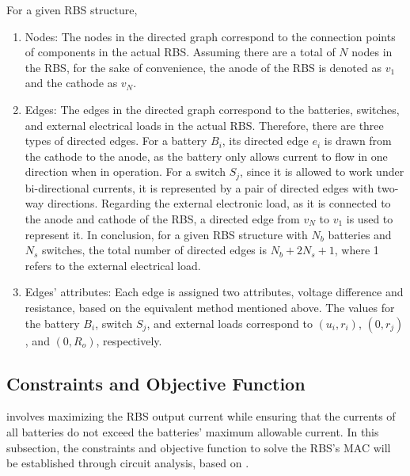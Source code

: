 \documentclass{article}
\begin{document}
For a given RBS structure, 
\begin{enumerate}
    \item Nodes:
        The nodes in the directed graph correspond to the connection points of components in the actual RBS. 
        Assuming there are a total of $N$ nodes in the RBS, for the sake of convenience, the anode of the RBS is denoted as $v_1$ and the cathode as $v_N$.
    \item Edges:
        The edges in the directed graph correspond to the batteries, switches, and external electrical loads in the actual RBS.
        Therefore, there are three types of directed edges. 
        For a battery $B_i$, its directed edge $e_i$ is drawn from the cathode to the anode, as the battery only allows current to flow in one direction when in operation.
        For a switch $S_j$, since it is allowed to work under bi-directional currents, it is represented by a pair of directed edges with two-way directions. 
        Regarding the external electronic load, as it is connected to the anode and cathode of the RBS, a directed edge from $v_N$ to $v_1$ is used to represent it. 
        In conclusion, for a given RBS structure with $N_b$ batteries and $N_s$ switches, the total number of directed edges is $N_b+2N_s+1$, where 1 refers to the external electrical load.
    \item Edges' attributes:
        Each edge is assigned two attributes, voltage difference and resistance, based on the equivalent method mentioned above.
        The values for the battery $B_i$, switch $S_j$, and external loads correspond to $(u_i, r_i)$, $(0, r_j)$, and $(0, R_o)$, respectively.
\end{enumerate}

\subsection{Constraints and Objective Function}

 involves maximizing the RBS output current while ensuring that the currents of all batteries do not exceed the batteries' maximum allowable current. 
In this subsection, the constraints and objective function to solve the RBS's MAC will be established through circuit analysis, based on .
\end{document}
